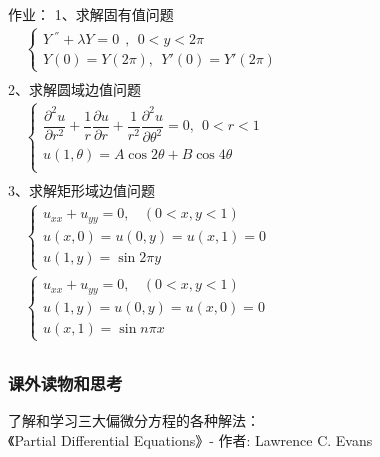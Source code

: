 \begin{frame}	
	作业：
	1、求解固有值问题\\ 
	$\begin{array}{lllllllll}
		& \begin{cases}
			Y~^{''} +\lambda Y=0  ~~,~~ 0<y<2\pi \\
			Y(0) =Y(2\pi) , ~~ Y'(0) =Y'(2\pi)
		\end{cases}\\	
	\end{array}$ \\ 
	2、求解圆域边值问题\\
	$\displaystyle  \begin{array}{lllllllll}
	&\begin{cases}
		\dfrac{\partial^2 u }{\partial r^2 } +\dfrac{1}{r } \dfrac{\partial u }{\partial r } +
		\dfrac{1}{r^2 } \dfrac{\partial ^2 u }{\partial \theta ^2  } =0, ~~ 0<r<1\\
		u(1,\theta)= A\cos 2 \theta +B \cos 4 \theta \\	
	\end{cases} \\	
	\end{array}$ \\ 
	3、求解矩形域边值问题\\
	$\begin{array}{lllllllll}
		& \begin{cases}
			u_{xx} +u_{yy} =0 ,~~~~ (0<x, y<1)\\
			u(x,0)= u(0,y)=u(x,1)= 0 \\
			u(1,y)= \sin 2\pi y
		\end{cases}\\	
		&\begin{cases}
			u_{xx} +u_{yy} =0 ,~~~~ (0<x, y<1)\\
			u(1,y)= u(0,y)=u(x,0)= 0 \\
			u(x,1)= \sin n\pi x
		\end{cases} \\	
	\end{array}$ \\ 	
\end{frame}

\begin{frame}
	\frametitle{课外读物和思考}
	了解和学习三大偏微分方程的各种解法：\\
	《Partial Differential Equations》- 作者: Lawrence C. Evans
\end{frame}
